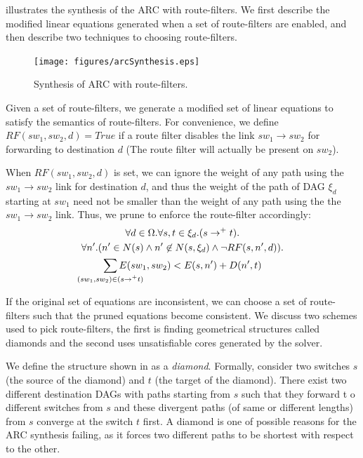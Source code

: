  illustrates the synthesis of 
the ARC with route-filters. We first describe the 
modified linear equations generated when a set of
route-filters are enabled, and then describe two
techniques to choosing route-filters. 
\begin{figure}
	\centering
	\texttt{[image: figures/arcSynthesis.eps]}
	\caption{Synthesis of ARC with route-filters.} \label{fig:arcSynthesis}
\end{figure}

Given a set of route-filters, we generate a modified 
set of linear equations to satisfy the 
semantics of route-filters.
For convenience, we define $RF(sw_1, sw_2, d) = True$ 
if a route filter disables the link $sw_1 \rightarrow sw_2$
for forwarding to destination $d$ (The route filter will
actually be present on $sw_2$). 

When $RF(sw_1, sw_2, d)$ is set, we can ignore the 
weight of any path using the $sw_1 \rightarrow sw_2$
link for destination $d$, and thus 
the weight of the path of DAG $\xi_d$
starting at $sw_1$ need not be smaller than the weight
of any path
using the the $sw_1 \rightarrow sw_2$ link. Thus,
we prune  to enforce the route-filter accordingly:
\begin{multline} \label{eq:uniq}
		\forall d \in \Omega. \forall s, t \in \xi_d. (s \rightarrow^+ t).\\ 
		\forall n'. (n' \in N(s) \wedge n' \not\in N(s, \xi_d) \wedge \neg RF(s,n',d)). \\
		\sum_{\mathclap{\substack{(sw_1, sw_2) \in (s \rightarrow^+ t)}}} 
		E(sw_1, sw_2) < E(s, n') + D(n', t)   
\end{multline}

If the original set of equations are inconsistent, we 
can choose a set of route-filters such that the pruned
equations become consistent. 
We discuss two schemes used to pick route-filters,
the first is finding geometrical structures called diamonds 
and the second uses unsatisfiable cores generated
by the solver.

We define the structure shown in 
as a \emph{diamond}. Formally,
consider two switches $s$ (the source of the diamond) 
and $t$ (the target of the diamond).
There exist two different destination DAGs with 
paths starting from $s$ such that they forward t
o different switches from $s$  
and these divergent paths (of same or
different lengths) from $s$ converge
at the switch $t$ first. A diamond is 
one of possible reasons for the ARC synthesis 
failing, as it forces two different paths to be 
shortest with respect to the other. 

